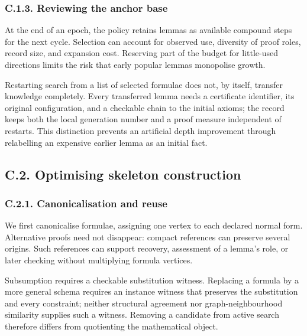 \documentclass[pdflatex,sn-basic,Numbered]{sn-jnl}
\begin{document}
\subsubsection*{C.1.3. Reviewing the anchor base}\label{c.1.3.-reviewing-the-anchor-base}

At the end of an epoch, the policy retains lemmas as available compound steps for the next cycle. Selection can account for observed use, diversity of proof roles, record size, and expansion cost. Reserving part of the budget for little-used directions limits the risk that early popular lemmas monopolise growth.

Restarting search from a list of selected formulae does not, by itself, transfer knowledge completely. Every transferred lemma needs a certificate identifier, its original configuration, and a checkable chain to the initial axioms; the record keeps both the local generation number and a proof measure independent of restarts. This distinction prevents an artificial depth improvement through relabelling an expensive earlier lemma as an initial fact.

\subsection*{C.2. Optimising skeleton construction}\label{c.2.-optimising-skeleton-construction}

\subsubsection*{C.2.1. Canonicalisation and reuse}\label{c.2.1.-canonicalisation-and-reuse}

We first canonicalise formulae, assigning one vertex to each declared normal form. Alternative proofs need not disappear: compact references can preserve several origins. Such references can support recovery, assessment of a lemma's role, or later checking without multiplying formula vertices.

Subsumption requires a checkable substitution witness. Replacing a formula by a more general schema requires an instance witness that preserves the substitution and every constraint; neither structural agreement nor graph-neighbourhood similarity supplies such a witness. Removing a candidate from active search therefore differs from quotienting the mathematical object.
\end{document}
